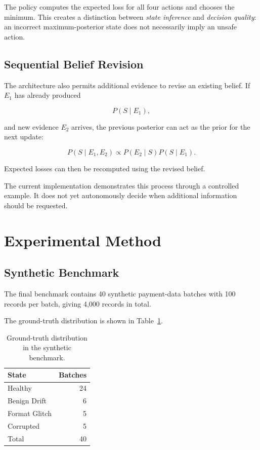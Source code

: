 \documentclass{article}
\begin{document}
The policy computes the expected loss for all four actions and chooses the minimum. This creates a distinction between \emph{state inference} and \emph{decision quality}: an incorrect maximum-posterior state does not necessarily imply an unsafe action.


\subsection{Sequential Belief Revision}

The architecture also permits additional evidence to revise an existing belief. If \(E_1\) has already produced

\[
P(S\mid E_1),
\]

and new evidence \(E_2\) arrives, the previous posterior can act as the prior for the next update:

\[
P(S\mid E_1,E_2)
\propto
P(E_2\mid S)P(S\mid E_1).
\]

Expected losses can then be recomputed using the revised belief.

The current implementation demonstrates this process through a controlled example. It does not yet autonomously decide when additional information should be requested.


\section{Experimental Method}

\subsection{Synthetic Benchmark}

The final benchmark contains 40 synthetic payment-data batches with 100 records per batch, giving 4,000 records in total.

The ground-truth distribution is shown in Table~\ref{tab:states}.

\begin{table}[t]
\centering
\begin{tabular}{lr}
\toprule
State & Batches \\
\midrule
Healthy & 24 \\
Benign Drift & 6 \\
Format Glitch & 5 \\
Corrupted & 5 \\
\midrule
Total & 40 \\
\bottomrule
\end{tabular}
\caption{Ground-truth distribution in the synthetic benchmark.}
\label{tab:states}
\end{table}
\end{document}
